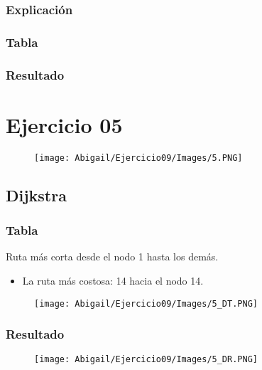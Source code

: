 \documentclass[12pt]{article}
\begin{document}
      \subsubsection{Explicación}

      \subsubsection{Tabla}

      \subsubsection{Resultado}

  
  \section{Ejercicio 05}

    \begin{figure}[h!]
      \centering
      \texttt{[image: Abigail/Ejercicio09/Images/5.PNG]}
    \end{figure} 

    \subsection{Dijkstra}

      \subsubsection{Tabla}
        Ruta más corta desde el nodo 1 hasta los demás.

        \begin{itemize}
          \item La ruta más costosa: 14 hacia el nodo 14.
        \end{itemize}

       \begin{figure}[h!]
          \centering
          \texttt{[image: Abigail/Ejercicio09/Images/5\_DT.PNG]}
        \end{figure} 

      \subsubsection{Resultado}
        \begin{figure}[h!]
          \centering
          \texttt{[image: Abigail/Ejercicio09/Images/5\_DR.PNG]}
        \end{figure} 
\end{document}

